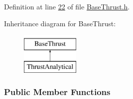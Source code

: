Definition at line \hyperlink{_base_thrust_8h_source_l00022}{22} of file \hyperlink{_base_thrust_8h_source}{Base\+Thrust.\+h}.

Inheritance diagram for Base\+Thrust\+:\begin{figure}[H]
\begin{center}
\leavevmode
\includegraphics[height=2.000000cm]{group___engine}
\end{center}
\end{figure}
\subsubsection*{Public Member Functions}
